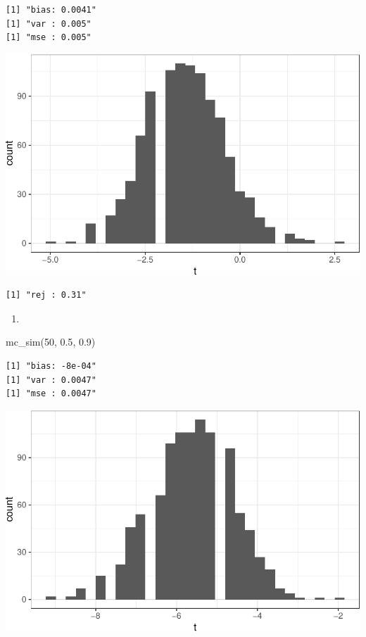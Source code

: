 \documentclass[
  letterpaper,
  DIV=11,
  numbers=noendperiod]{scrreprt}
\newenvironment{Shaded}{\begin{snugshade}}{\end{snugshade}}
\newcommand{\DecValTok}[1]{\textcolor[rgb]{0.68,0.00,0.00}{#1}}
\newcommand{\FloatTok}[1]{\textcolor[rgb]{0.68,0.00,0.00}{#1}}
\newcommand{\FunctionTok}[1]{\textcolor[rgb]{0.28,0.35,0.67}{#1}}
\newcommand{\NormalTok}[1]{\textcolor[rgb]{0.00,0.23,0.31}{#1}}
\providecommand{\tightlist}{%
  \setlength{\itemsep}{0pt}\setlength{\parskip}{0pt}}\usepackage{longtable,booktabs,array}
\begin{document}
\begin{verbatim}
[1] "bias: 0.0041"
[1] "var : 0.005"
[1] "mse : 0.005"
\end{verbatim}

\includegraphics{07-inference_files/figure-pdf/unnamed-chunk-12-1.pdf}

\begin{verbatim}
[1] "rej : 0.31"
\end{verbatim}

\begin{enumerate}
\def\labelenumi{\arabic{enumi}.}
\setcounter{enumi}{5}
\tightlist
\item
\end{enumerate}

\begin{Shaded}
\begin{Highlighting}[]
\FunctionTok{mc\_sim}\NormalTok{(}\DecValTok{50}\NormalTok{, }\FloatTok{0.5}\NormalTok{, }\FloatTok{0.9}\NormalTok{)}
\end{Highlighting}
\end{Shaded}

\begin{verbatim}
[1] "bias: -8e-04"
[1] "var : 0.0047"
[1] "mse : 0.0047"
\end{verbatim}

\includegraphics{07-inference_files/figure-pdf/unnamed-chunk-13-1.pdf}
\end{document}
